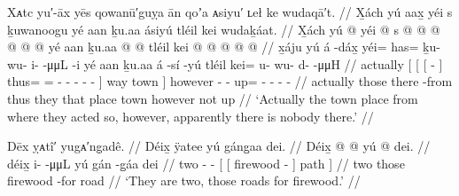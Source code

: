 \ex\label{ex:91-121-burned-up-shaman-and-uncle}%
%
\begingl
	\glpreamble	Xᴀtc yu′-āx yēs qowanū′guỵa ān qoʼa ᴀsiyu′ ʟeł ke wudaqā′t. //
	\glpreamble	X̱ách yú aax̱ yéi s ḵuwanoogu yé aan ḵu.aa ásiyú tléil kei wudaḵáat. //
	\gla	X̱ách {} yú {} {}  @ {} {} 
			yéi @ s @  @ {} @ {} @ {} @ {} @ {} {} yé aan {}
		ḵu.aa  @ {} @ {}
		tléil kei @  @ {} @ {} @ {} @ {} //
	\glb	x̱áju {} yú {} {} á -dáx̱ {}
			yéi= has= ḵu- wu- i-  -μμL -i {} yé aan {}
		ḵu.aa á -sí -yú
		tléil kei= u- wu- d-  -μμH //
	\glc	actually {}[  {}[ {}[  - {}]
			thus= = - - -
				 - - {}] way town {}]
		however  - -
		 up= - - -  - //
	\gld	actually {} those {} {} there -from {}
			thus they  {} {} {} {} \·that {}
			place town {}
		however  {} {}
		not up  {} {} {} {} //
	\glft	‘Actually the town place from where they acted so, however, apparently
		there is nobody there.’
		//
\endgl
\xe


\ex\label{ex:91-122-two-roads-for-firewood}%
%
\begingl
	\glpreamble	Dēx ỵᴀtî′ yugᴀ′ng̣adê. //
	\glpreamble	Déix̱ ÿatee yú gáng̱aa dei. //
	\gla	Déix̱  @ {} @ {}
		{} yú {}  @ {} {} dei. {} //
	\glb	déix̱ i-  -μμL
		{} yú {} gán -g̱áa {} dei {} //
	\glc	two -  -
		{}[  {}[ firewood - {}] path {}] //
	\gld	two  {} {}
		{} those {} firewood -for {} road {} //
	\glft	‘They are two, those roads for firewood.’
		//
\endgl
\xe

